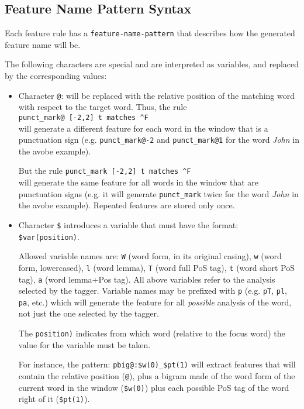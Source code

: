 \documentclass[a4paper]{book}
\begin{document}
\subsection{Feature Name Pattern Syntax}
 \label{s:fex-pattern}

  Each feature rule has a \verb#feature-name-pattern# that describes how
  the generated feature name will be.

  The following characters are
  special and are interpreted as variables, and replaced by the
  corresponding values:
  \begin{itemize}
    \item Character \verb#@#: will be replaced with the relative
      position of the matching word with respect to the target
      word.  Thus, the rule\\ 
      \verb#punct_mark@ [-2,2] t matches ^F# \\
      will generate a different feature for each word in the window 
      that is a punctuation sign (e.g.  \texttt{punct\_mark@-2} and
      \texttt{punct\_mark@1} for the word \textit{John} in the
      avobe example).
      
      But the rule \verb#punct_mark [-2,2] t matches ^F# \\ will
      generate the same feature for all words in the window that
      are punctuation signs (e.g. it will generate \texttt{punct\_mark} 
      twice for the word \textit{John} in the avobe example).
      Repeated features are stored only once.
      
    \item Character \verb#$# introduces a variable that must have
      the format: \verb#$var(position)#. 
      
      Allowed variable names
      are: \verb#W# (word form, in its original casing), \verb#w#
      (word form, lowercased), \verb#l# (word lemma), \verb#T#
      (word full PoS tag), \verb#t# (word short PoS tag), \verb#a#
      (word lemma+Pos tag).  All above variables refer to the
      analysis selected by the tagger.  Variable names may be
      prefixed with \verb#p# (e.g. \verb#pT#, \verb#pl#, \verb#pa#,
      etc.)  which will generate the feature for all
      \textit{possible} analysis of the word, not just the one selected
      by the tagger.
      
      The \verb#position)# indicates from which word (relative to
      the focus word) the value for the variable must be taken.
      
      For instance, the pattern: \verb#pbig@:$w(0)_$pt(1)# will
      extract features that will contain the relative position
      (\verb#@#), plus a bigram made of the word form of the
      current word in the window (\verb#$w(0)#) plus each possible
      PoS tag of the word right of it (\verb#$pt(1)#).


\end{itemize}
\end{document}
